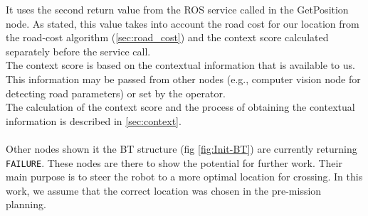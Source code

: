         It uses the second return value from the ROS service called in the GetPosition node. As stated, this value takes into account the road cost for our location from the road-cost algorithm (\ref{sec:road_cost}) and the context score calculated separately before the service call.\\
        The context score is based on the contextual information that is available to us. This information may be passed from other nodes (e.g., computer vision node for detecting road parameters) or set by the operator.\\
        The calculation of the context score and the process of obtaining the contextual information is described in \ref{sec:context}.\\\\

    \noindent Other nodes shown it the BT structure (fig \ref{fig:Init-BT}) are currently returning \texttt{FAILURE}. These nodes are there to show the potential for further work. Their main purpose is to steer the robot to a more optimal location for crossing. In this work, we assume that the correct location was chosen in the pre-mission planning.